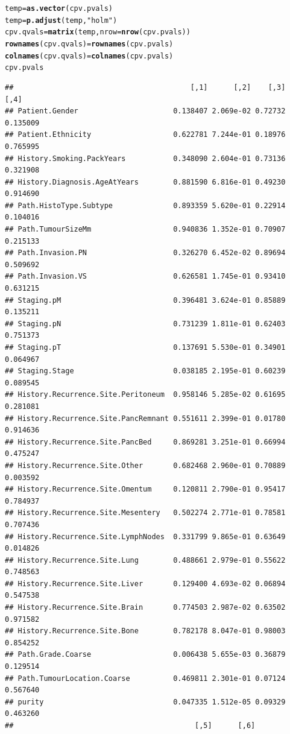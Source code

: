 \documentclass{article}\usepackage[]{graphicx}\usepackage[]{color}
\makeatletter
\newcommand{\hlstr}[1]{\textcolor[rgb]{0.192,0.494,0.8}{#1}}%
\newcommand{\hlstd}[1]{\textcolor[rgb]{0.345,0.345,0.345}{#1}}%
\newcommand{\hlkwb}[1]{\textcolor[rgb]{0.69,0.353,0.396}{#1}}%
\newcommand{\hlkwc}[1]{\textcolor[rgb]{0.333,0.667,0.333}{#1}}%
\newcommand{\hlkwd}[1]{\textcolor[rgb]{0.737,0.353,0.396}{\textbf{#1}}}%
\newenvironment{kframe}{%
 \def\at@end@of@kframe{}%
 \ifinner\ifhmode%
  \def\at@end@of@kframe{\end{minipage}}%
  \begin{minipage}{\columnwidth}%
 \fi\fi%
 \def\FrameCommand##1{\hskip\@totalleftmargin \hskip-\fboxsep
 \colorbox{shadecolor}{##1}\hskip-\fboxsep
     \hskip-\linewidth \hskip-\@totalleftmargin \hskip\columnwidth}%
 \MakeFramed {\advance\hsize-\width
   \@totalleftmargin\z@ \linewidth\hsize
   \@setminipage}}%
 {\par\unskip\endMakeFramed%
 \at@end@of@kframe}
\newenvironment{knitrout}{}{} %
\makeatother
\begin{document}
\begin{knitrout}
\begin{kframe}
\begin{alltt}
\hlstd{temp} \hlkwb{=} \hlkwd{as.vector}\hlstd{(cpv.pvals)}
\hlstd{temp} \hlkwb{=} \hlkwd{p.adjust}\hlstd{(temp,} \hlstr{"holm"}\hlstd{)}
\hlstd{cpv.qvals} \hlkwb{=} \hlkwd{matrix}\hlstd{(temp,} \hlkwc{nrow} \hlstd{=} \hlkwd{nrow}\hlstd{(cpv.pvals))}
\hlkwd{rownames}\hlstd{(cpv.qvals)} \hlkwb{=} \hlkwd{rownames}\hlstd{(cpv.pvals)}
\hlkwd{colnames}\hlstd{(cpv.qvals)} \hlkwb{=} \hlkwd{colnames}\hlstd{(cpv.pvals)}
\hlstd{cpv.pvals}
\end{alltt}
\begin{verbatim}
##                                         [,1]      [,2]    [,3]     [,4]
## Patient.Gender                      0.138407 2.069e-02 0.72732 0.135009
## Patient.Ethnicity                   0.622781 7.244e-01 0.18976 0.765995
## History.Smoking.PackYears           0.348090 2.604e-01 0.73136 0.321908
## History.Diagnosis.AgeAtYears        0.881590 6.816e-01 0.49230 0.914690
## Path.HistoType.Subtype              0.893359 5.620e-01 0.22914 0.104016
## Path.TumourSizeMm                   0.940836 1.352e-01 0.70907 0.215133
## Path.Invasion.PN                    0.326270 6.452e-02 0.89694 0.509692
## Path.Invasion.VS                    0.626581 1.745e-01 0.93410 0.631215
## Staging.pM                          0.396481 3.624e-01 0.85889 0.135211
## Staging.pN                          0.731239 1.811e-01 0.62403 0.751373
## Staging.pT                          0.137691 5.530e-01 0.34901 0.064967
## Staging.Stage                       0.038185 2.195e-01 0.60239 0.089545
## History.Recurrence.Site.Peritoneum  0.958146 5.285e-02 0.61695 0.281081
## History.Recurrence.Site.PancRemnant 0.551611 2.399e-01 0.01780 0.914636
## History.Recurrence.Site.PancBed     0.869281 3.251e-01 0.66994 0.475247
## History.Recurrence.Site.Other       0.682468 2.960e-01 0.70889 0.003592
## History.Recurrence.Site.Omentum     0.120811 2.790e-01 0.95417 0.784937
## History.Recurrence.Site.Mesentery   0.502274 2.771e-01 0.78581 0.707436
## History.Recurrence.Site.LymphNodes  0.331799 9.865e-01 0.63649 0.014826
## History.Recurrence.Site.Lung        0.488661 2.979e-01 0.55622 0.748563
## History.Recurrence.Site.Liver       0.129400 4.693e-02 0.06894 0.547538
## History.Recurrence.Site.Brain       0.774503 2.987e-02 0.63502 0.971582
## History.Recurrence.Site.Bone        0.782178 8.047e-01 0.98003 0.854252
## Path.Grade.Coarse                   0.006438 5.655e-03 0.36879 0.129514
## Path.TumourLocation.Coarse          0.469811 2.301e-01 0.07124 0.567640
## purity                              0.047335 1.512e-05 0.09329 0.463260
##                                          [,5]      [,6]

\end{verbatim}
\end{kframe}
\end{knitrout}
\end{document}
